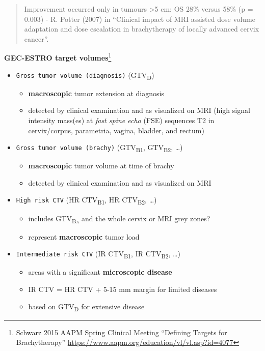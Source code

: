 \documentclass[]{book}
\providecommand{\tightlist}{%
  \setlength{\itemsep}{0pt}\setlength{\parskip}{0pt}}
\let\rmarkdownfootnote\footnote%
\def\footnote{\protect\rmarkdownfootnote}
\theoremstyle{definition}
\theoremstyle{definition}
\theoremstyle{definition}
\theoremstyle{remark}
\begin{document}
\begin{quote}
Improvement occurred only in tumours \textgreater{}5 cm: OS 28\% versus
58\% (p = 0.003) - R. Potter (2007) in ``Clinical impact of MRI assisted
dose volume adaptation and dose escalation in brachytherapy of locally
advanced cervix cancer''.
\end{quote}

\textbf{GEC-ESTRO target volumes}\footnote{Schwarz 2015 AAPM Spring
  Clinical Meeting ``Defining Targets for Brachytherapy''
  \url{https://www.aapm.org/education/vl/vl.asp?id=4077}}

\begin{itemize}
\tightlist
\item
  \texttt{Gross\ tumor\ volume\ (diagnosis)} (GTV\textsubscript{D})

  \begin{itemize}
  \tightlist
  \item
    \textbf{macroscopic} tumor extension at diagnosis
  \item
    detected by clinical examination and as visualized on MRI (high
    signal intensity mass(es) at \emph{fast spine echo} (FSE) sequences
    T2 in cervix/corpus, parametria, vagina, bladder, and rectum)
  \end{itemize}
\item
  \texttt{Gross\ tumor\ volume\ (brachy)} (GTV\textsubscript{B1},
  GTV\textsubscript{B2}, \ldots{})

  \begin{itemize}
  \tightlist
  \item
    \textbf{macroscopic} tumor volume at time of brachy
  \item
    detected by clinical examination and as visualized on MRI
  \end{itemize}
\item
  \texttt{High\ risk\ CTV} (HR CTV\textsubscript{B1}, HR
  CTV\textsubscript{B2}, \ldots{})

  \begin{itemize}
  \tightlist
  \item
    includes GTV\textsubscript{Bx} and the whole cervix or MRI grey
    zones?
  \item
    represent \textbf{macroscopic} tumor load
  \end{itemize}
\item
  \texttt{Intermediate\ risk\ CTV} (IR CTV\textsubscript{B1}, IR
  CTV\textsubscript{B2}, \ldots{})

  \begin{itemize}
  \tightlist
  \item
    areas with a significant \textbf{microscopic disease}
  \item
    IR CTV = HR CTV + 5-15 mm margin for limited diseases
  \item
    based on GTV\textsubscript{D} for extensive disease
  \end{itemize}
\end{itemize}
\end{document}
